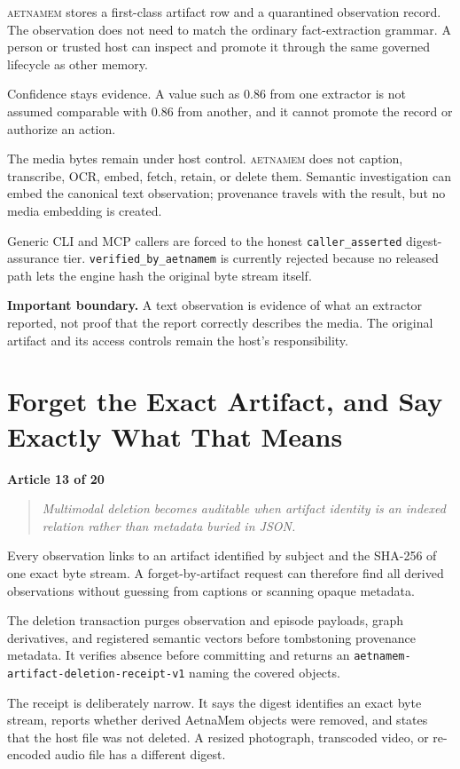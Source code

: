 \documentclass[11pt]{article}
\newcommand{\system}{\textsc{aetnamem}}
\newcommand{\articlelabel}[1]{%
  \noindent\colorbox{aetnaTeal!10}{%
    \parbox{0.96\textwidth}{\color{aetnaInk}\small\textbf{Article #1 of 20}}}%
  \par\medskip}
\newcommand{\coreidea}[1]{%
  \begin{quote}\color{aetnaTeal}\large\itshape #1\end{quote}}
\newcommand{\boundary}[1]{%
  \par\smallskip\noindent\textbf{Important boundary.} #1}
\begin{document}
\system{} stores a first-class artifact row and a quarantined observation
record. The observation does not need to match the ordinary fact-extraction
grammar. A person or trusted host can inspect and promote it through the same
governed lifecycle as other memory.

Confidence stays evidence. A value such as 0.86 from one extractor is not
assumed comparable with 0.86 from another, and it cannot promote the record or
authorize an action.

The media bytes remain under host control. \system{} does not caption,
transcribe, OCR, embed, fetch, retain, or delete them. Semantic investigation
can embed the canonical text observation; provenance travels with the result,
but no media embedding is created.

Generic CLI and MCP callers are forced to the honest
\texttt{caller\_asserted} digest-assurance tier.
\texttt{verified\_by\_aetnamem} is currently rejected because no released path
lets the engine hash the original byte stream itself.

\boundary{A text observation is evidence of what an extractor reported, not
proof that the report correctly describes the media. The original artifact
and its access controls remain the host's responsibility.}

\clearpage
\section{Forget the Exact Artifact, and Say Exactly What That Means}
\articlelabel{13}
\coreidea{Multimodal deletion becomes auditable when artifact identity is an
indexed relation rather than metadata buried in JSON.}

Every observation links to an artifact identified by subject and the SHA-256
of one exact byte stream. A forget-by-artifact request can therefore find all
derived observations without guessing from captions or scanning opaque
metadata.

The deletion transaction purges observation and episode payloads, graph
derivatives, and registered semantic vectors before tombstoning provenance
metadata. It verifies absence before committing and returns an
\texttt{aetnamem-artifact-deletion-receipt-v1} naming the covered objects.

The receipt is deliberately narrow. It says the digest identifies an exact
byte stream, reports whether derived AetnaMem objects were removed, and states
that the host file was not deleted. A resized photograph, transcoded video, or
re-encoded audio file has a different digest.
\end{document}

